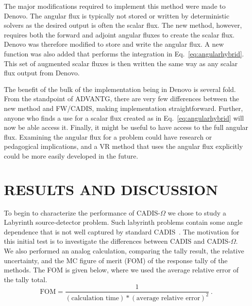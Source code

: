 \documentclass[12pt]{article}
\begin{document}

The major modifications required to implement this method were made to Denovo. 
The angular flux is typically not stored or written by deterministic solvers as the desired output is often the scalar flux.
The new method, however, requires both the forward and adjoint angular fluxes to create the scalar flux. 
Denovo was therefore modified to store and write the angular flux.
A new function was also added that performs the integration in Eq.~\eqref{eq:angularhybrid}. 
This set of augmented scalar fluxes is then written the same way as any scalar flux output from Denovo.

The benefit of the bulk of the implementation being in Denovo is several fold. 
From the standpoint of ADVANTG, there are very few differences between the new method and FW/CADIS, making implementation straightforward.
Further, anyone who finds a use for a scalar flux created as in Eq.~\eqref{eq:angularhybrid} will now be able  access it.
Finally, it might be useful to have access to the full angular flux. 
Examining the angular flux for a problem could have research or pedagogical implications, and a VR method that uses the angular flux explicitly could be more easily developed in the future.

%
\section{RESULTS AND DISCUSSION} 
\label{sect::results}


To begin to characterize the performance of CADIS-$\Omega$ we chose to study a Labyrinth source-detector problem.
Such labyrinth problems contain some angle dependence that is not well captured by standard CADIS~\cite{peplow_consistent_2012}. 
The motivation for this initial test is to investigate the differences between CADIS and CADIS-$\Omega$.
We also performed an analog calculation, comparing  the tally result, the relative uncertainty, and the MC figure of merit (FOM) of the response tally of the methods.
The FOM is given below, where we used the average relative error of the tally total.
%
\[\text{FOM} = \frac{1}{(\text{calculation time})*(\text{average relative error})^2}\:. \]
\end{document}
